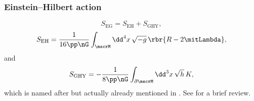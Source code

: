 \documentclass[a4paper,11pt]{article}
\begin{document}
\subsubsection{Einstein--Hilbert action}

\begin{equation}
S_\text{EG} = S_\text{EH} + S_\text{GHY},
\end{equation}
\begin{equation}
S_\text{EH} = \frac{1}{16\pp\nG}\int_\mscrM\dd^4 x\,\sqrt{-g}\, 
\rbr{R-2\mitLambda},
\end{equation}
and
\begin{equation}
S_\text{GHY} = -\frac{1}{8\pp\nG}\int_{\partial\mscrM}\dd^3 x\,\sqrt{h}\, K,
\end{equation}
which is named after \cite{Gibbons1977,York1972} but actually already mentioned 
in \cite{Einstein1916}. See \cite{Dyer2009} for a brief review.



\printbibliography
\end{document}
